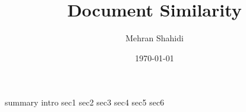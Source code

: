 \documentclass{article}
\title{Document Similarity }
\author{Mehran Shahidi}
\date{\today}
\begin{document}
\maketitle
{}
{summary}
\newpage
\tableofcontents
\newpage
{}
{intro}
{sec1}
{sec2}
{sec3}
{sec4}
{sec5}
{sec6}
\newpage
\end{document}
